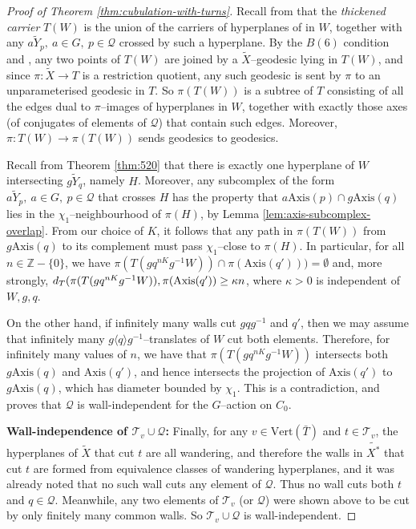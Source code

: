 \documentclass[11pt,oneside]{amsart}
\newcounter{ax}
\theoremstyle{definition}
\newcommand{\field}[1]{\mathbb{#1}}
\newcommand{\integers}{\ensuremath{\field{Z}}}
\newcommand{\dist}{\textup{\textsf{d}}}
\newcommand{\vertices}{\mathrm{Vert}}
\newcommand{\axis}{\mathrm{Axis}}
\begin{document}
\begin{proof}[Proof of Theorem \ref{thm:cubulation-with-turns}]
Recall from \cite[Sec. 5]{Wise:QCH} that the \emph{thickened carrier} $T(W)$ is the union of the carriers of hyperplanes of in $W$, together with any $a\widetilde Y_p,\ a\in G,\ p\in\mathcal Q$ crossed by such a hyperplane.  By the $B(6)$ condition and \cite[Thm. 5.28]{Wise:QCH}, any two points of $T(W)$ are joined by a $\widetilde X$--geodesic lying in $T(W)$, and since $\pi:\widetilde X\to T$ is a restriction quotient, any such geodesic is sent by $\pi$ to an unparameterised geodesic in $T$.  So $\pi(T(W))$ is a subtree of $T$ consisting of all the edges dual to $\pi$--images of hyperplanes in $W$, together with exactly those axes (of conjugates of elements of $\mathcal Q$) that contain such edges.  Moreover, $\pi:T(W)\to \pi(T(W))$ sends geodesics to geodesics.  

Recall from Theorem \ref{thm:520} that there is exactly one hyperplane of $W$ intersecting $g\widetilde Y_q$, namely $H$.  Moreover, any subcomplex of the form $a\widetilde Y_p,\ a\in G,\ p\in\mathcal Q$ that crosses $H$ has the property that $a\axis(p)\cap g\axis(q)$ lies in the $\chi_1$--neighbourhood of $\pi(H)$, by Lemma \ref{lem:axis-subcomplex-overlap}.  From our choice of $K$, it follows that any path in $\pi(T(W))$ from $g\axis(q)$ to its complement must pass $\chi_1$--close to $\pi(H)$.  In particular, for all $n\in\integers-\{0\}$, we have $\pi(T(gq^{nK}g^{-1}W))\cap \pi(\axis(q')))=\emptyset$ and, more strongly, $\dist_T(\pi(T(gq^{nK}g^{-1}W)),\pi(\axis(q'))\geq \kappa n$, where $\kappa>0$ is independent of $W,g,q$.  

On the other hand, if infinitely many walls cut $gqg^{-1}$ and $q'$, then we may assume that infinitely many $g\langle q\rangle g^{-1}$--translates of $W$ cut both elements.  Therefore, for infinitely many values of $n$, we have that $\pi(T(gq^{nK}g^{-1}W))$ intersects both $g\axis(q)$ and $\axis(q')$, and hence intersects the projection of $\axis(q')$ to $g\axis(q)$, which has diameter bounded by $\chi_1$.  This is a contradiction, and proves that $\mathcal Q$ is wall-independent for the $G$--action on $C_0$.  

\textbf{Wall-independence of $\mathcal T_v\cup\mathcal Q$:}  Finally, for any $v\in\vertices(\bar T)$ and $t\in\mathcal T_v$, the hyperplanes of $\widetilde X$ that cut $t$ are all wandering, and therefore the walls in $\widetilde{X^*}$ that cut $t$ are formed from equivalence classes of wandering hyperplanes, and it was already noted that no such wall cuts any element of $\mathcal Q$.  Thus no wall cuts both $t$ and $q\in\mathcal Q$.  Meanwhile, any two elements of $\mathcal T_v$ (or $\mathcal Q$) were shown above to be cut by only finitely many common walls.  So $\mathcal T_v\cup\mathcal Q$ is wall-independent.
\end{proof}
\end{document}
